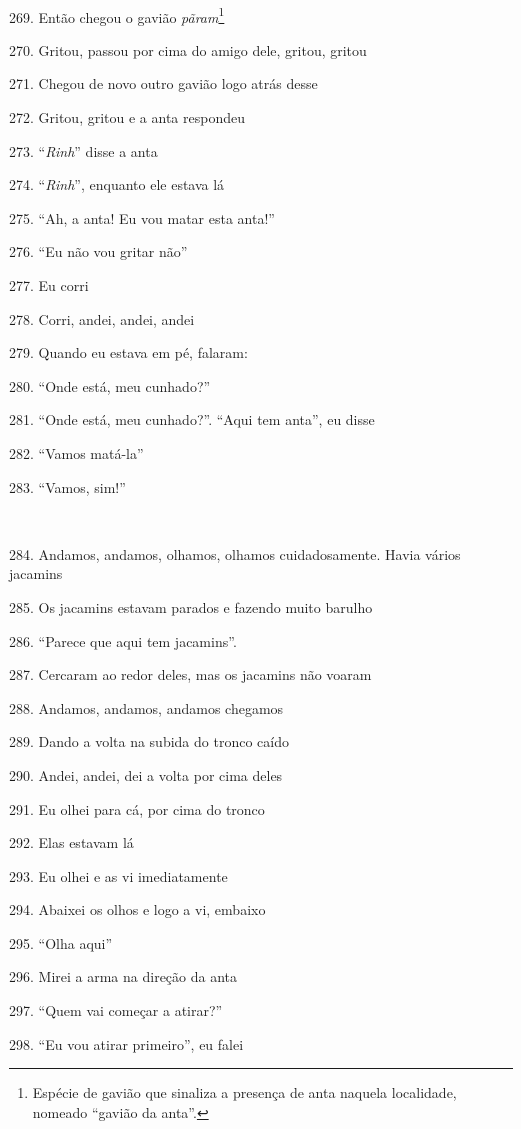 ~

269. Então chegou o gavião \emph{pãram}\footnote{Espécie de gavião que
  sinaliza a presença de anta naquela localidade, nomeado ``gavião da
  anta''.}

270. Gritou, passou por cima do amigo dele, gritou, gritou

271. Chegou de novo outro gavião logo atrás desse

272. Gritou, gritou e a anta respondeu

273. ``\emph{Rinh}'' disse a anta

274. ``\emph{Rinh}'', enquanto ele estava lá

275. ``Ah, a anta! Eu vou matar esta anta!''

276. ``Eu não vou gritar não''

277. Eu corri

278. Corri, andei, andei, andei

279. Quando eu estava em pé, falaram:

280. ``Onde está, meu cunhado?''

281. ``Onde está, meu cunhado?''. ``Aqui tem anta'', eu disse

282. ``Vamos matá-la''

283. ``Vamos, sim!''

~

284. Andamos, andamos, olhamos, olhamos cuidadosamente. Havia vários jacamins

285. Os jacamins estavam parados e fazendo muito barulho

286. ``Parece que aqui tem jacamins''.

287. Cercaram ao redor deles, mas os jacamins não voaram

288. Andamos, andamos, andamos chegamos

289. Dando a volta na subida do tronco caído

290. Andei, andei, dei a volta por cima deles

291. Eu olhei para cá, por cima do tronco

292. Elas estavam lá

293. Eu olhei e as vi imediatamente

294. Abaixei os olhos e logo a vi, embaixo

295. ``Olha aqui''

296. Mirei a arma na direção da anta

297. ``Quem vai começar a atirar?''

298. ``Eu vou atirar primeiro'', eu falei


